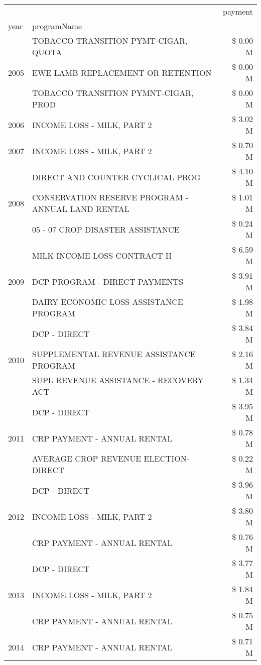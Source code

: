 \begin{tabular}{llr}
\toprule
 &  & payment \\
year & programName &  \\
\midrule
\multirow[t]{3}{*}{2005} & TOBACCO TRANSITION PYMT-CIGAR, QUOTA & \$ 0.00 M \\
 & EWE LAMB REPLACEMENT OR RETENTION & \$ 0.00 M \\
 & TOBACCO TRANSITION PYMNT-CIGAR, PROD & \$ 0.00 M \\
\cline{1-3}
2006 & INCOME LOSS - MILK, PART 2 & \$ 3.02 M \\
\cline{1-3}
2007 & INCOME LOSS - MILK, PART 2 & \$ 0.70 M \\
\cline{1-3}
\multirow[t]{3}{*}{2008} & DIRECT AND COUNTER CYCLICAL PROG & \$ 4.10 M \\
 & CONSERVATION RESERVE PROGRAM - ANNUAL LAND RENTAL & \$ 1.01 M \\
 & 05 - 07 CROP DISASTER ASSISTANCE & \$ 0.24 M \\
\cline{1-3}
\multirow[t]{3}{*}{2009} & MILK INCOME LOSS CONTRACT II & \$ 6.59 M \\
 & DCP PROGRAM - DIRECT PAYMENTS & \$ 3.91 M \\
 & DAIRY ECONOMIC LOSS ASSISTANCE PROGRAM & \$ 1.98 M \\
\cline{1-3}
\multirow[t]{3}{*}{2010} & DCP - DIRECT & \$ 3.84 M \\
 & SUPPLEMENTAL REVENUE ASSISTANCE PROGRAM & \$ 2.16 M \\
 & SUPL REVENUE ASSISTANCE - RECOVERY ACT & \$ 1.34 M \\
\cline{1-3}
\multirow[t]{3}{*}{2011} & DCP - DIRECT & \$ 3.95 M \\
 & CRP PAYMENT - ANNUAL RENTAL & \$ 0.78 M \\
 & AVERAGE CROP REVENUE ELECTION-DIRECT & \$ 0.22 M \\
\cline{1-3}
\multirow[t]{3}{*}{2012} & DCP - DIRECT & \$ 3.96 M \\
 & INCOME LOSS - MILK, PART 2 & \$ 3.80 M \\
 & CRP PAYMENT - ANNUAL RENTAL & \$ 0.76 M \\
\cline{1-3}
\multirow[t]{3}{*}{2013} & DCP - DIRECT & \$ 3.77 M \\
 & INCOME LOSS - MILK, PART 2 & \$ 1.84 M \\
 & CRP PAYMENT - ANNUAL RENTAL & \$ 0.75 M \\
\cline{1-3}
\multirow[t]{3}{*}{2014} & CRP PAYMENT - ANNUAL RENTAL & \$ 0.71 M \\

\end{tabular}
